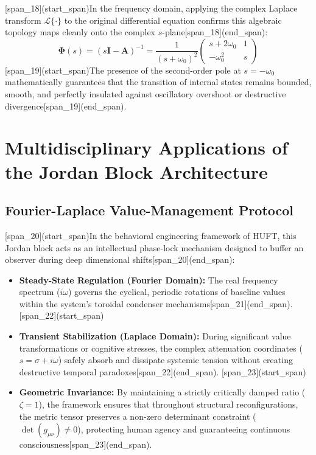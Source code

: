 \documentclass[12pt,letterpaper]{article}
\theoremstyle{definition}
\begin{document}
[span_18](start_span)In the frequency domain, applying the complex Laplace transform $\mathcal{L}\{\cdot\}$ to the original differential equation confirms this algebraic topology maps cleanly onto the complex $s$-plane[span_18](end_span):
\begin{equation}
    \mathbf{\Phi}(s) = (s\mathbf{I} - \mathbf{A})^{-1} = \frac{1}{(s + \omega_{0})^{2}} \begin{pmatrix} s + 2\omega_{0} & 1 \\ -\omega_{0}^{2} & s \end{pmatrix}
\end{equation}
[span_19](start_span)The presence of the second-order pole at $s = -\omega_{0}$ mathematically guarantees that the transition of internal states remains bounded, smooth, and perfectly insulated against oscillatory overshoot or destructive divergence[span_19](end_span).

\section{Multidisciplinary Applications of the Jordan Block Architecture}

\subsection{Fourier-Laplace Value-Management Protocol}
[span_20](start_span)In the behavioral engineering framework of HUFT, this Jordan block acts as an intellectual phase-lock mechanism designed to buffer an observer during deep dimensional shifts[span_20](end_span):
\begin{itemize}
    [span_21](start_span)\item \textbf{Steady-State Regulation (Fourier Domain):} The real frequency spectrum ($i\omega$) governs the cyclical, periodic rotations of baseline values within the system's toroidal condenser mechanisms[span_21](end_span).
    [span_22](start_span)\item \textbf{Transient Stabilization (Laplace Domain):} During significant value transformations or cognitive stresses, the complex attenuation coordinates ($s = \sigma + i\omega$) safely absorb and dissipate systemic tension without creating destructive temporal paradoxes[span_22](end_span).
    [span_23](start_span)\item \textbf{Geometric Invariance:} By maintaining a strictly critically damped ratio ($\zeta = 1$), the framework ensures that throughout structural reconfigurations, the metric tensor preserves a non-zero determinant constraint ($\det(g_{\mu\nu}) \neq 0$), protecting human agency and guaranteeing continuous consciousness[span_23](end_span).
\end{itemize}
\end{document}
